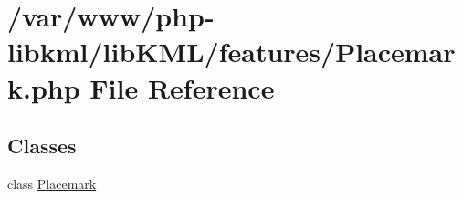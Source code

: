 \hypertarget{Placemark_8php}{
\section{/var/www/php-\/libkml/libKML/features/Placemark.php File Reference}
\label{df/da1/Placemark_8php}
}
\subsection*{Classes}
\begin{DoxyCompactItemize}
\item 
class \hyperlink{classPlacemark}{Placemark}
\end{DoxyCompactItemize}
